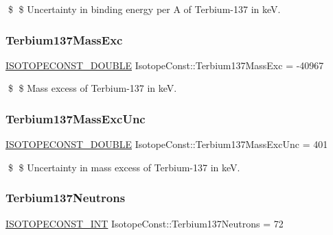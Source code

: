 \$ \$ Uncertainty in binding energy per A of Terbium-\/137 in keV. \mbox{\label{group___isotope_const-_terbium-_tb137_ga8aff36514af28164c89cf04b449f6976}} 
\subsubsection{\texorpdfstring{Terbium137\+Mass\+Exc}{Terbium137MassExc}}
{\footnotesize\ttfamily \mbox{\hyperlink{group___isotope_const-_macros_ga8f45a7272ce02c0b4c65c44636ed719a}{I\+S\+O\+T\+O\+P\+E\+C\+O\+N\+S\+T\+\_\+\+D\+O\+U\+B\+LE}} Isotope\+Const\+::\+Terbium137\+Mass\+Exc = -\/40967}

\$ \$ Mass excess of Terbium-\/137 in keV. \mbox{\label{group___isotope_const-_terbium-_tb137_ga3815bdafaeb5c2f8dfa2b04c9281add0}} 
\subsubsection{\texorpdfstring{Terbium137\+Mass\+Exc\+Unc}{Terbium137MassExcUnc}}
{\footnotesize\ttfamily \mbox{\hyperlink{group___isotope_const-_macros_ga8f45a7272ce02c0b4c65c44636ed719a}{I\+S\+O\+T\+O\+P\+E\+C\+O\+N\+S\+T\+\_\+\+D\+O\+U\+B\+LE}} Isotope\+Const\+::\+Terbium137\+Mass\+Exc\+Unc = 401}

\$ \$ Uncertainty in mass excess of Terbium-\/137 in keV. \mbox{\label{group___isotope_const-_terbium-_tb137_gac10b900cb04c8fdcdd2d67286c116da2}} 
\subsubsection{\texorpdfstring{Terbium137\+Neutrons}{Terbium137Neutrons}}
{\footnotesize\ttfamily \mbox{\hyperlink{group___isotope_const-_macros_ga5f18360b3e99483a35c32d789e62621c}{I\+S\+O\+T\+O\+P\+E\+C\+O\+N\+S\+T\+\_\+\+I\+NT}} Isotope\+Const\+::\+Terbium137\+Neutrons = 72}


